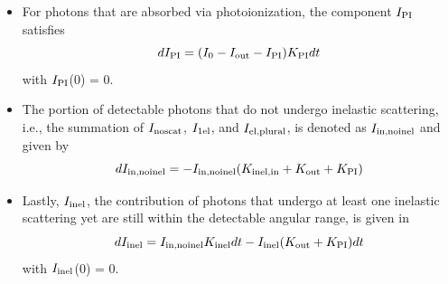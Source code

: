 \documentclass[]{article}
\newcommand\nt{\textup{\scriptsize{0}}}
\newcommand\inel{\textup{\scriptsize{inel}}}
\newcommand\inelin{\textup{\scriptsize{inel,in}}}
\newcommand\out{\textup{\scriptsize{out}}}
\newcommand\PI{\textup{\scriptsize{PI}}}
\newcommand\noscat{\textup{\scriptsize{noscat}}}
\newcommand\sel{\textup{\scriptsize{1el}}}
\newcommand\elpl{\textup{\scriptsize{el,plural}}}
\newcommand\innoinel{\textup{\scriptsize{in,noinel}}}
\begin{document}
\begin{itemize}
\item For photons that are absorbed via photoionization, the component $I_{\PI}$ satisfies
\begin{equation}
dI_{\PI} = (I_{\nt} - I_{\out} - I_{\PI})K_{\PI} dt
\end{equation}
with $I_{\PI}$(0) = 0.

\item The portion of detectable photons that do not undergo inelastic scattering, i.e., the summation of $I_{\noscat}$, $I_{\sel}$, and $I_{\elpl}$, is denoted as $I_{\innoinel}$ and given by
\begin{equation}
dI_{\innoinel} = -I_{\innoinel}(K_{\inelin}+K_{\out}+K_{\PI})
\end{equation}

\item Lastly, $I_{\inel}$, the contribution of photons that undergo at least one inelastic scattering yet are still within the detectable angular range, is given in
\begin{equation}
dI_{\inel} = I_{\innoinel}K_{\inel} dt - I_{\inel}(K_{\out}+K_{\PI}) dt
\end{equation}
with $I_{\inel}$(0) = 0.

\end{itemize}
\end{document}
